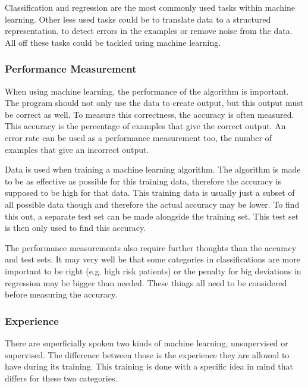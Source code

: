 \documentclass[10pt,a4paper]{report}
\begin{document}
	Classification and regression are the most commonly used tasks within 
	machine learning. Other less used tasks could be to translate data to a 
	structured representation, to detect errors in the examples or remove noise 
	from the data. All off these tasks could be tackled using machine 
	learning.\cite{Goodfellow-et-al-2016}
	
	\subsubsection{Performance Measurement}
	
	When using machine learning, the performance of the algorithm is important. 
	The program should not only use the data to create output, but this output 
	must be correct as well. To measure this correctness, the accuracy is often 
	measured. This accuracy is the percentage of examples that give the correct 
	output. An error rate can be used as a performance measurement too, the 
	number of examples that give an incorrect 
	output.\cite{Goodfellow-et-al-2016}
	
	Data is used when training a machine learning algorithm. The algorithm is 
	made to be as effective as possible for this training data, therefore the 
	accuracy is supposed to be high for that data. This training data is 
	usually just a subset of all possible data though and therefore the actual 
	accuracy may be lower. To find this out, a separate test set can be made 
	alongside the training set. This test set is then only used to find this 
	accuracy.\cite{Goodfellow-et-al-2016}
	
	The performance measurements also require further thoughts than the 
	accuracy and test sets. It may very well be that some categories in 
	classifications are more important to be right (e.g. high risk patients) or 
	the penalty for big deviations in regression may be bigger than needed. 
	These things all need to be considered before measuring the accuracy. 
	\cite{Goodfellow-et-al-2016}
	
	\subsubsection{Experience}
	
	There are superficially spoken two kinds of machine learning, unsupervised 
	or supervised. The difference between those is the experience they are 
	allowed to have during its training. This training is done with a specific 
	idea in mind that differs for these two 
	categories.\cite{Goodfellow-et-al-2016}
	
\end{document}
